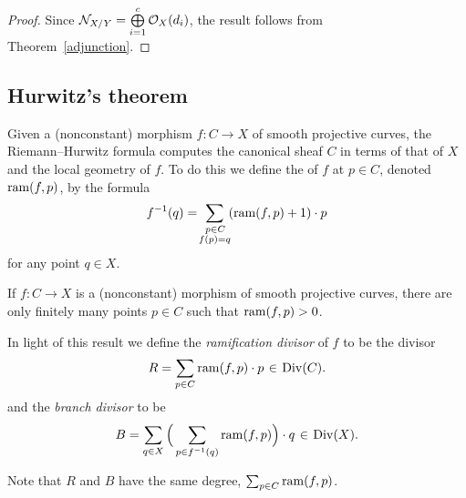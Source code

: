 \begin{proof}
Since ${\mathcal N}_{X/Y} = \bigoplus\limits_{i=1}^{c} {\mathcal O}_{X}(d_{i})$, the result follows from Theorem~\ref{adjunction}.
\end{proof}

\subsection*{Hurwitz's theorem}
 Given a (nonconstant) morphism $f : C \to X$ of smooth projective
 curves, the Riemann--Hurwitz formula computes the canonical sheaf
 $C$ in terms of that of  $X$ and the local geometry of $f$. To do
 this we define the
%
%
%
%
of $f$ at $p \in C$,  denoted $\operatorname{ram}(f,p)$, 
by the formula 
$$
 f^{-1}(q) = \!\sum_{\substack{\kern1ptp\in C\\ f(p)=q}}\! (\operatorname{ram}(f,p)+1)\cdot p
 $$
 for any point $q \in X$. 

\begin{proposition}
If $f : C \to X$ is a (nonconstant) morphism  of smooth projective curves,
there are only finitely many
points $p\in C$ such that $\operatorname{ram}(f,p)>0$.
\end{proposition}

In light of this result we define the \emph{ramification divisor} of $f$ to be the divisor
 $$
 R = \sum_{p \in C} \ram(f,p)\cdot p \; \in \;  \Div(C).
 $$
 and the \emph{branch divisor} to be
 $$
 B = \sum_{q \in X} \Big(\sum_{p \in f^{-1}(q)} \ram(f,p) \Big)\cdot q \; \in \; \Div(X).
 $$

Note that $R$ and $B$ have the same degree, $\sum_{p \in C} \operatorname{ram}(f,p)$.

